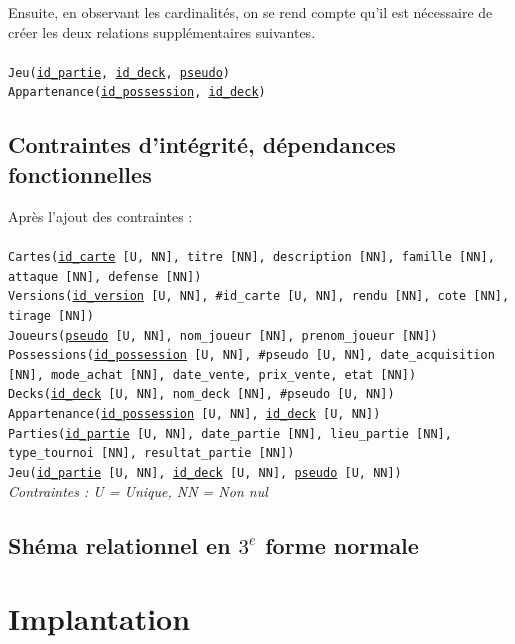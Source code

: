 \documentclass[a4paper,10.5pt]{article}
\begin{document}
Ensuite, en observant les cardinalités, on se rend compte qu'il est nécessaire de créer les deux relations supplémentaires suivantes. \\
\\
\texttt{Jeu(\underline{id\_partie}, \underline{id\_deck}, \underline{pseudo})} \\
\texttt{Appartenance(\underline{id\_possession}, \underline{id\_deck})} \\

\subsection{Contraintes d'intégrité, dépendances fonctionnelles}
Après l'ajout des contraintes : \\
\\
\texttt{Cartes(\underline{id\_carte} [U, NN], titre [NN], description [NN], famille [NN], attaque [NN], defense [NN])} \\
\texttt{Versions(\underline{id\_version} [U, NN], \#id\_carte [U, NN], rendu [NN], cote [NN], tirage [NN])} \\
\texttt{Joueurs(\underline{pseudo} [U, NN], nom\_joueur [NN], prenom\_joueur [NN])} \\
\texttt{Possessions(\underline{id\_possession} [U, NN], \#pseudo [U, NN], date\_acquisition [NN], mode\_achat [NN], date\_vente, prix\_vente, etat [NN])} \\
\texttt{Decks(\underline{id\_deck} [U, NN], nom\_deck [NN], \#pseudo [U, NN])} \\
\texttt{Appartenance(\underline{id\_possession} [U, NN], \underline{id\_deck} [U, NN])} \\
\texttt{Parties(\underline{id\_partie} [U, NN], date\_partie [NN], lieu\_partie [NN], type\_tournoi [NN], resultat\_partie [NN])} \\
\texttt{Jeu(\underline{id\_partie} [U, NN], \underline{id\_deck} [U, NN], \underline{pseudo} [U, NN])} \\

\textit{Contraintes : U = Unique, NN = Non nul}

\subsection{Shéma relationnel en $3^e$ forme normale}

\section{Implantation}
\end{document}
